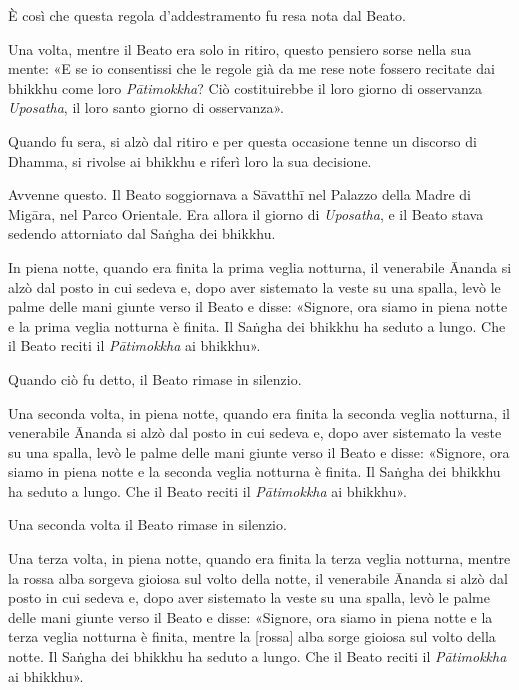 È così che questa regola d’addestramento fu resa nota dal Beato.




Una volta, mentre il Beato era solo in ritiro, questo pensiero sorse
nella sua mente: «E se io consentissi che le regole già da me rese note
fossero recitate dai bhikkhu come loro \emph{Pātimokkha}? Ciò costituirebbe
il loro giorno di osservanza \emph{Uposatha}, il loro santo giorno di
osservanza».


Quando fu sera, si alzò dal ritiro e per questa occasione tenne un
discorso di Dhamma, si rivolse ai bhikkhu e riferì loro la sua
decisione.




Avvenne questo. Il Beato soggiornava a Sāvatthī nel Palazzo della Madre
di Migāra, nel Parco Orientale. Era allora il giorno di \emph{Uposatha}, e il
Beato stava sedendo attorniato dal Saṅgha dei bhikkhu.


In piena notte, quando era finita la prima veglia notturna, il
venerabile Ānanda si alzò dal posto in cui sedeva e, dopo aver sistemato
la veste su una spalla, levò le palme delle mani giunte verso il Beato e
disse: «Signore, ora siamo in piena notte e la prima veglia notturna è
finita. Il Saṅgha dei bhikkhu ha seduto a lungo. Che il Beato reciti il
\emph{Pātimokkha} ai bhikkhu».


Quando ciò fu detto, il Beato rimase in silenzio.


Una seconda volta, in piena notte, quando era finita la seconda veglia
notturna, il venerabile Ānanda si alzò dal posto in cui sedeva e, dopo
aver sistemato la veste su una spalla, levò le palme delle mani giunte
verso il Beato e disse: «Signore, ora siamo in piena notte e la seconda
veglia notturna è finita. Il Saṅgha dei bhikkhu ha seduto a lungo. Che
il Beato reciti il \emph{Pātimokkha} ai bhikkhu».


Una seconda volta il Beato rimase in silenzio.


Una terza volta, in piena notte, quando era finita la terza veglia
notturna, mentre la rossa alba sorgeva gioiosa sul volto della notte, il
venerabile Ānanda si alzò dal posto in cui sedeva e, dopo aver sistemato
la veste su una spalla, levò le palme delle mani giunte verso il Beato e
disse: «Signore, ora siamo in piena notte e la terza veglia notturna è
finita, mentre la [rossa] alba sorge gioiosa sul volto della notte. Il
Saṅgha dei bhikkhu ha seduto a lungo. Che il Beato reciti il
\emph{Pātimokkha} ai bhikkhu».


